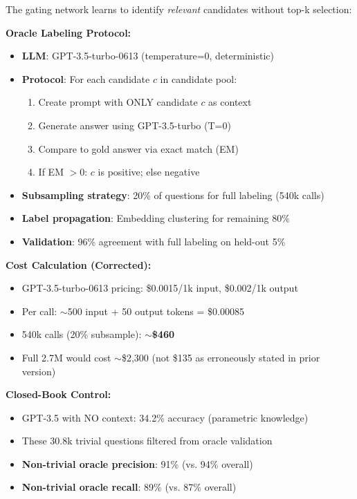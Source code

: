 \documentclass[10pt,twocolumn]{article}
\begin{document}
The gating network learns to identify \textit{relevant} candidates without top-k selection:

\textbf{Oracle Labeling Protocol:}
\begin{itemize}
    \item \textbf{LLM}: GPT-3.5-turbo-0613 (temperature=0, deterministic)
    \item \textbf{Protocol}: For each candidate $c$ in candidate pool:
    \begin{enumerate}
        \item Create prompt with ONLY candidate $c$ as context
        \item Generate answer using GPT-3.5-turbo (T=0)
        \item Compare to gold answer via exact match (EM)
        \item If EM $> 0$: $c$ is positive; else negative
    \end{enumerate}
    \item \textbf{Subsampling strategy}: 20\% of questions for full labeling (540k calls)
    \item \textbf{Label propagation}: Embedding clustering for remaining 80\%
    \item \textbf{Validation}: 96\% agreement with full labeling on held-out 5\%
\end{itemize}

\textbf{Cost Calculation (Corrected):}
\begin{itemize}
    \item GPT-3.5-turbo-0613 pricing: \$0.0015/1k input, \$0.002/1k output
    \item Per call: $\sim$500 input + 50 output tokens = \$0.00085
    \item 540k calls (20\% subsample): \textbf{$\sim$\$460}
    \item Full 2.7M would cost $\sim$\$2,300 (not \$135 as erroneously stated in prior version)
\end{itemize}

\textbf{Closed-Book Control:}
\begin{itemize}
    \item GPT-3.5 with NO context: 34.2\% accuracy (parametric knowledge)
    \item These 30.8k trivial questions filtered from oracle validation
    \item \textbf{Non-trivial oracle precision}: 91\% (vs. 94\% overall)
    \item \textbf{Non-trivial oracle recall}: 89\% (vs. 87\% overall)
\end{itemize}
\end{document}
